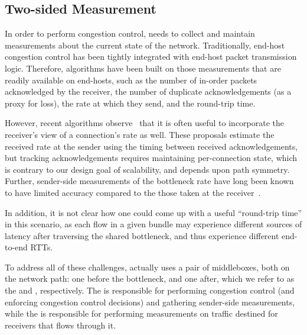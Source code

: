 \subsection{Two-sided Measurement}\label{s:design:twosided}
In order to perform congestion control, \name needs to collect and maintain measurements about the current state of the network.
Traditionally, end-host congestion control has been tightly integrated with end-host packet transmission logic. Therefore, algorithms have been built on those measurements that are readily available on end-hosts, such as the number of in-order packets acknowledged by the receiver, the number of duplicate acknowledgements (as a proxy for loss), the rate at which they send, and the round-trip time.

However, recent algorithms observe~\cite{bbr, sprout, remy, nimbus} that it is often useful to incorporate the receiver's view of a connection's rate as well. These proposals estimate the received rate at the sender using the timing between received acknowledgements, but tracking acknowledgements requires maintaining per-connection state, which is contrary to our design goal of scalability, and depends upon path symmetry. Further, sender-side measurements of the bottleneck rate have long been known to have limited accuracy compared to the those taken at the receiver~\cite{packet-dynamics, path-properties}.

In addition, it is not clear how one could come up with a useful ``round-trip time'' in this scenario, as each flow in a given bundle may experience different sources of latency after traversing the shared bottleneck, and thus experience different end-to-end RTTs. 

To address all of these challenges, \name actually uses a pair of middleboxes, both
on the network path: one before the bottleneck, and one after, which we refer to as the \textit{\inbox}
and \textit{\outbox}, respectively. The \inbox is responsible for performing congestion control (and enforcing congestion control decisions) and gathering sender-side measurements, while the \outbox is responsible for performing measurements on traffic destined for receivers that flows through it.


